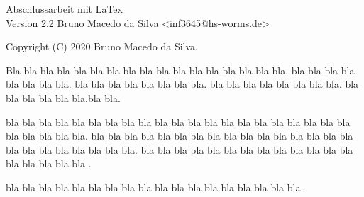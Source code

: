 \begin{titlepage}
    \vspace*{7cm}
    \begin{center}
        \Huge
        Abschlussarbeit mit LaTex\\
        \vspace{1cm}
        \large
        Version 2.2
        \vspace{2cm}
        Bruno Macedo da Silva <inf3645@hs-worms.de>

    \end{center}
    \normalsize
    \vfill
    Copyright (C) 2020 Bruno Macedo da Silva.

    Bla bla bla bla bla bla bla bla bla bla bla bla bla bla bla bla bla. bla bla bla bla bla bla bla bla. 
    bla bla bla bla bla bla bla bla. bla bla bla bla bla bla bla bla. bla bla bla bla bla bla.bla bla.

    bla bla bla bla bla bla bla bla bla bla bla bla bla bla bla bla bla bla bla bla bla bla bla bla bla bla.
    bla bla bla bla bla bla bla bla bla bla bla bla bla bla bla bla bla bla bla bla bla bla bla bla.
    bla bla bla bla bla bla bla bla bla bla bla bla bla bla bla bla bla bla .


    bla bla bla bla bla bla bla bla bla bla bla bla bla bla bla bla bla bla.


\end{titlepage}